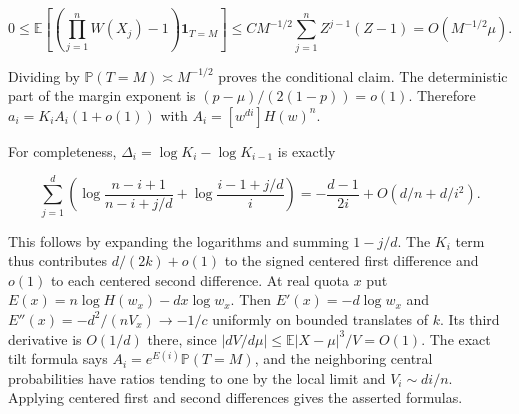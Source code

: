 \begin{equation*}
0\le\mathbb E[(\prod_{j=1}^n W(X_j)-1)\mathbf1_{T=M}]
\le C M^{-1/2}\sum_{j=1}^n Z^{j-1}(Z-1)
=O(M^{-1/2}\mu).
\end{equation*}

Dividing by $\mathbb P(T=M)\asymp M^{-1/2}$ proves the conditional claim. The deterministic part of the margin exponent is $(p-\mu)/(2(1-p))=o(1)$. Therefore $a_i=K_i A_i(1+o(1))$ with $A_i=[w^{di}]H(w)^n$.

For completeness, $\Delta_i=\log K_i-\log K_{i-1}$ is exactly

\begin{equation*}
\sum_{j=1}^d\left(\log\frac{n-i+1}{n-i+j/d}
                        +\log\frac{i-1+j/d}{i}\right)
=-\frac{d-1}{2i}+O(d/n+d/i^2).
\end{equation*}

This follows by expanding the logarithms and summing $1-j/d$. The $K_i$ term thus contributes $d/(2k)+o(1)$ to the signed centered first difference and $o(1)$ to each centered second difference. At real quota $x$ put $E(x)=n\log H(w_x)-dx\log w_x$. Then $E'(x)=-d\log w_x$ and $E''(x)=-d^2/(n V_x)\to-1/c$ uniformly on bounded translates of $k$. Its third derivative is $O(1/d)$ there, since $|dV/d\mu|\le \mathbb E|X-\mu|^3/V=O(1)$. The exact tilt formula says $A_i=e^{E(i)}\mathbb P(T=M)$, and the neighboring central probabilities have ratios tending to one by the local limit and $V_i\sim di/n$. Applying centered first and second differences gives the asserted formulas.
